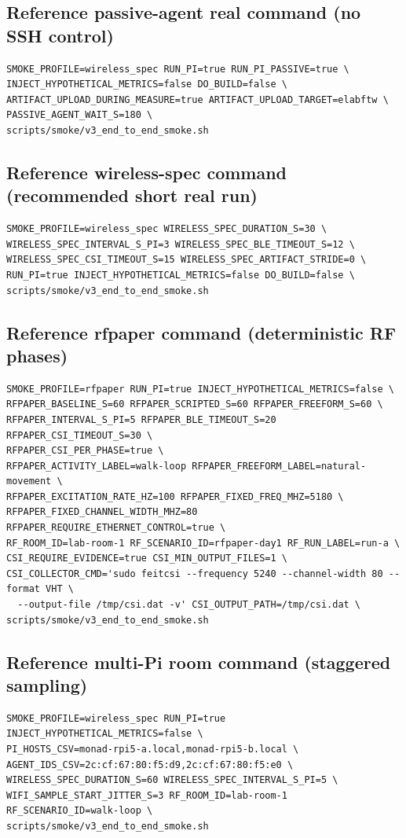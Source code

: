 \documentclass[11pt,a4paper]{article}
\begin{document}
\subsection{Reference passive-agent real command (no SSH control)}
\begin{verbatim}
SMOKE_PROFILE=wireless_spec RUN_PI=true RUN_PI_PASSIVE=true \
INJECT_HYPOTHETICAL_METRICS=false DO_BUILD=false \
ARTIFACT_UPLOAD_DURING_MEASURE=true ARTIFACT_UPLOAD_TARGET=elabftw \
PASSIVE_AGENT_WAIT_S=180 \
scripts/smoke/v3_end_to_end_smoke.sh
\end{verbatim}

\subsection{Reference wireless-spec command (recommended short real run)}
\begin{verbatim}
SMOKE_PROFILE=wireless_spec WIRELESS_SPEC_DURATION_S=30 \
WIRELESS_SPEC_INTERVAL_S_PI=3 WIRELESS_SPEC_BLE_TIMEOUT_S=12 \
WIRELESS_SPEC_CSI_TIMEOUT_S=15 WIRELESS_SPEC_ARTIFACT_STRIDE=0 \
RUN_PI=true INJECT_HYPOTHETICAL_METRICS=false DO_BUILD=false \
scripts/smoke/v3_end_to_end_smoke.sh
\end{verbatim}

\subsection{Reference rfpaper command (deterministic RF phases)}
\begin{verbatim}
SMOKE_PROFILE=rfpaper RUN_PI=true INJECT_HYPOTHETICAL_METRICS=false \
RFPAPER_BASELINE_S=60 RFPAPER_SCRIPTED_S=60 RFPAPER_FREEFORM_S=60 \
RFPAPER_INTERVAL_S_PI=5 RFPAPER_BLE_TIMEOUT_S=20 RFPAPER_CSI_TIMEOUT_S=30 \
RFPAPER_CSI_PER_PHASE=true \
RFPAPER_ACTIVITY_LABEL=walk-loop RFPAPER_FREEFORM_LABEL=natural-movement \
RFPAPER_EXCITATION_RATE_HZ=100 RFPAPER_FIXED_FREQ_MHZ=5180 \
RFPAPER_FIXED_CHANNEL_WIDTH_MHZ=80 RFPAPER_REQUIRE_ETHERNET_CONTROL=true \
RF_ROOM_ID=lab-room-1 RF_SCENARIO_ID=rfpaper-day1 RF_RUN_LABEL=run-a \
CSI_REQUIRE_EVIDENCE=true CSI_MIN_OUTPUT_FILES=1 \
CSI_COLLECTOR_CMD='sudo feitcsi --frequency 5240 --channel-width 80 --format VHT \
  --output-file /tmp/csi.dat -v' CSI_OUTPUT_PATH=/tmp/csi.dat \
scripts/smoke/v3_end_to_end_smoke.sh
\end{verbatim}

\subsection{Reference multi-Pi room command (staggered sampling)}
\begin{verbatim}
SMOKE_PROFILE=wireless_spec RUN_PI=true INJECT_HYPOTHETICAL_METRICS=false \
PI_HOSTS_CSV=monad-rpi5-a.local,monad-rpi5-b.local \
AGENT_IDS_CSV=2c:cf:67:80:f5:d9,2c:cf:67:80:f5:e0 \
WIRELESS_SPEC_DURATION_S=60 WIRELESS_SPEC_INTERVAL_S_PI=5 \
WIFI_SAMPLE_START_JITTER_S=3 RF_ROOM_ID=lab-room-1 RF_SCENARIO_ID=walk-loop \
scripts/smoke/v3_end_to_end_smoke.sh
\end{verbatim}
\end{document}

